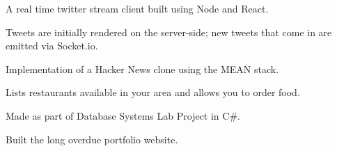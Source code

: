 \documentclass[a4paper]{resume}
\begin{document}
\begin{minipage}[t]{0.66\textwidth}

\begin{tightitemize}
\item A real time twitter stream client built using Node and React.
\item Tweets are initially rendered on the server-side; new tweets that come in are emitted via Socket.io.
\end{tightitemize}

\sectionspace %




\begin{tightitemize}
\item Implementation of a Hacker News clone using the MEAN stack.
\end{tightitemize}

\sectionspace %




\begin{tightitemize}
\item Lists restaurants available in your area and allows you to order food.
\item Made as part of Database Systems Lab Project in C\#.
\end{tightitemize}

\sectionspace %




\begin{tightitemize}
\item Built the long overdue portfolio website.
\end{tightitemize}

\sectionspace %



\end{minipage}
\end{document}
